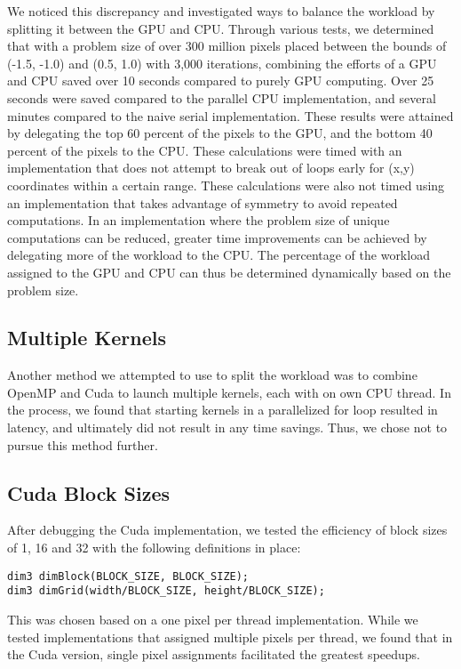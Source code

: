 \documentclass{article}
\begin{document}
We noticed this discrepancy and investigated ways to balance the workload by splitting it between the GPU and CPU. Through various tests, we determined that with a problem size of over 300 million pixels placed between the bounds of (-1.5, -1.0) and (0.5, 1.0) with 3,000 iterations, combining the efforts of a GPU and CPU saved over 10 seconds compared to purely GPU computing. Over 25 seconds were saved compared to the parallel CPU implementation, and several minutes compared to the naive serial implementation. These results were attained by delegating the top 60 percent of the pixels to the GPU, and the bottom 40 percent of the pixels to the CPU. These calculations were timed with an implementation that does not attempt to break out of loops early for (x,y) coordinates within a certain range. These calculations were also not timed using an implementation that takes advantage of symmetry to avoid repeated computations. In an implementation where the problem size of unique computations can be reduced, greater time improvements can be achieved by delegating more of the workload to the CPU. The percentage of the workload assigned to the GPU and CPU can thus be determined dynamically based on the problem size. 

\subsection{Multiple Kernels}

Another method we attempted to use to split the workload was to combine OpenMP and Cuda to launch multiple kernels, each with on own CPU thread. In the process, we found that starting kernels in a parallelized for loop resulted in latency, and ultimately did not result in any time savings. Thus, we chose not to pursue this method further.

\subsection{Cuda Block Sizes}

After debugging the Cuda implementation, we tested the efficiency of block sizes of 1, 16 and 32 with the following definitions in place: 

\begin{verbatim}
dim3 dimBlock(BLOCK_SIZE, BLOCK_SIZE); 
dim3 dimGrid(width/BLOCK_SIZE, height/BLOCK_SIZE);
\end{verbatim}

This was chosen based on a one pixel per thread implementation. While we tested implementations that assigned multiple pixels per thread, we found that in the Cuda version, single pixel assignments facilitated the greatest speedups. 
\end{document}
